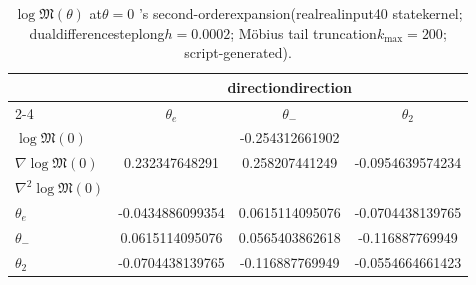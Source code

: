 \begin{table}[H]
\centering
\scriptsize
\setlength{\tabcolsep}{8pt}
\renewcommand{\arraystretch}{1.2}
\caption{$\log\mathfrak{M}(\theta)$ at$\theta=0$ 's second-orderexpansion(realrealinput40 statekernel; dualdifferencesteplong$h=0.0002$; Möbius tail truncation$k_{\max}=200$; script-generated).}
\label{tab:real-input-40-logM-theta-taylor}
\begin{tabular}{@{}lccc@{}}
\toprule
 & \multicolumn{3}{c}{directiondirection} \\
\cmidrule(lr){2-4}
 & $\theta_e$ & $\theta_-$ & $\theta_2$ \\
\midrule
$\log\mathfrak{M}(0)$ & \multicolumn{3}{c}{-0.254312661902} \\
\midrule
$\nabla\log\mathfrak{M}(0)$ & 0.232347648291 & 0.258207441249 & -0.0954639574234 \\
\midrule
$\nabla^2\log\mathfrak{M}(0)$ &  &  &  \\
$\theta_e$ & -0.0434886099354 & 0.0615114095076 & -0.0704438139765 \\
$\theta_-$ & 0.0615114095076 & 0.0565403862618 & -0.116887769949 \\
$\theta_2$ & -0.0704438139765 & -0.116887769949 & -0.0554664661423 \\
\bottomrule
\end{tabular}
\end{table}
